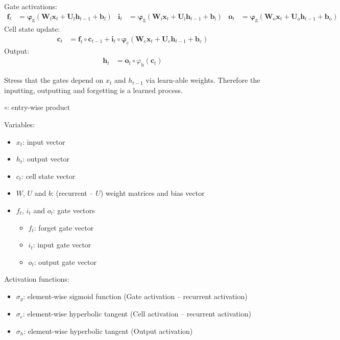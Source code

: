 Gate activations:
\begin{align*}
  \mathbf{f}_{t} &= \bm{\varphi}_{\text{g}}\left( \mathbf{W}_{\text{f}} \mathbf{x}_{t} + \mathbf{U}_{\text{f}} \mathbf{h}_{t-1} + \mathbf{b}_{\text{f}} \right) &
  \mathbf{i}_{t} &= \bm{\varphi}_{\text{g}}\left( \mathbf{W}_{\text{i}} \mathbf{x}_{t} + \mathbf{U}_{\text{i}} \mathbf{h}_{t-1} + \mathbf{b}_{\text{i}} \right) &
  \mathbf{o}_{t} &= \bm{\varphi}_{\text{g}}\left( \mathbf{W}_{\text{o}} \mathbf{x}_{t} + \mathbf{U}_{\text{o}} \mathbf{h}_{t-1} + \mathbf{b}_{\text{o}} \right)
\end{align*}
Cell state update:
\begin{align*}
  \mathbf{c}_{t} &= \mathbf{f}_{t} \circ \mathbf{c}_{t-1}
                   + \mathbf{i}_{t} \circ \bm{\varphi}_{\text{c}}(
                   \mathbf{W}_{\text{c}} \mathbf{x}_{t}+ \mathbf{U}_{\text{c}}
                   \mathbf{h}_{t-1} + \mathbf{b}_{\text{c}})
\end{align*}
Output:
\begin{align*}
  \mathbf{h}_{t} &= \mathbf{o}_{t} \circ \varphi_{\text{h}}(\mathbf{c}_{t})
\end{align*}

Stress that the gates depend on $x_t$ and $h_{t-1}$ via learn-able weights.
Therefore the inputting, outputting and forgetting is a learned process.

$\circ$: entry-wise product


Variables:
\begin{itemize}
\item $x_t$: input vector
\item $h_t$: output vector
\item $c_t$: cell state vector
\item $W$, $U$ and $b$: (recurrent -- $U$) weight matrices and bias vector
\item $f_t$, $i_t$ and $o_t$: gate vectors
  \begin{itemize}
  \item $f_t$: forget gate vector
  \item $i_t$: input gate vector
  \item $o_t$: output gate vector
  \end{itemize}
\end{itemize}

Activation functions:
\begin{itemize}
\item $\sigma_g$: element-wise sigmoid function (Gate activation -- recurrent
  activation)
\item $\sigma_c$: element-wise hyperbolic tangent (Cell activation -- recurrent
  activation)
\item $\sigma_h$: element-wise hyperbolic tangent (Output activation)
\end{itemize}

